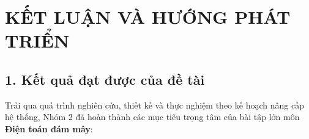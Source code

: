 
\chapter*{KẾT LUẬN VÀ HƯỚNG PHÁT TRIỂN}

\section*{1. Kết quả đạt được của đề tài}
Trải qua quá trình nghiên cứu, thiết kế và thực nghiệm theo kế hoạch nâng cấp hệ thống, Nhóm 2 đã hoàn thành các mục tiêu trọng tâm của bài tập lớn môn \textbf{Điện toán đám mây}:
